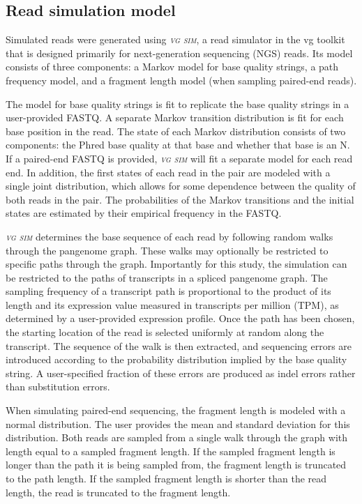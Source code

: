 \documentclass[11pt]{ucthesis}
\newcommand{\tool}[1]{\emph{\textsc{#1}}}
\begin{document}
\subsection{Read simulation model}

Simulated reads were generated using \tool{vg sim}, a read simulator in the vg toolkit that is designed primarily for next-generation sequencing (NGS) reads. Its model consists of three components: a Markov model for base quality strings, a path frequency model, and a fragment length model (when sampling paired-end reads).

The model for base quality strings is fit to replicate the base quality strings in a user-provided FASTQ. A separate Markov transition distribution is fit for each base position in the read. The state of each Markov distribution consists of two components: the Phred base quality at that base and whether that base is an N. If a paired-end FASTQ is provided, \tool{vg sim} will fit a separate model for each read end. In addition, the first states of each read in the pair are modeled with a single joint distribution, which allows for some dependence between the quality of both reads in the pair. The probabilities of the Markov transitions and the initial states are estimated by their empirical frequency in the FASTQ.

\tool{vg sim} determines the base sequence of each read by following random walks through the pangenome graph. These walks may optionally be restricted to specific paths through the graph. Importantly for this study, the simulation can be restricted to the paths of transcripts in a spliced pangenome graph. The sampling frequency of a transcript path is proportional to the product of its length and its expression value measured in transcripts per million (TPM), as determined by a user-provided expression profile. Once the path has been chosen, the starting location of the read is selected uniformly at random along the transcript. The sequence of the walk is then extracted, and sequencing errors are introduced according to the probability distribution implied by the base quality string. A user-specified fraction of these errors are produced as indel errors rather than substitution errors.

When simulating paired-end sequencing, the fragment length is modeled with a normal distribution. The user provides the mean and standard deviation for this distribution. Both reads are sampled from a single walk through the graph with length equal to a sampled fragment length. If the sampled fragment length is longer than the path it is being sampled from, the fragment length is truncated to the path length. If the sampled fragment length is shorter than the read length, the read is truncated to the fragment length.
\end{document}
